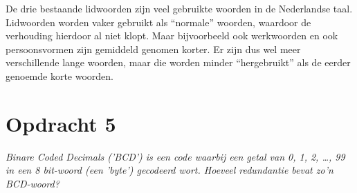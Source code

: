 De drie bestaande lidwoorden zijn veel gebruikte woorden in de Nederlandse taal. Lidwoorden worden vaker gebruikt als ``normale'' woorden, waardoor de verhouding hierdoor al niet klopt. Maar bijvoorbeeld ook werkwoorden en ook persoonsvormen zijn gemiddeld genomen korter. Er zijn dus wel meer verschillende lange woorden, maar die worden minder ``hergebruikt'' als de eerder genoemde korte woorden. 

\section{Opdracht 5}
\emph{Binare Coded Decimals ('BCD') is een code waarbij een getal van 0, 1, 2, \ldots, 99 in een 8 bit-woord (een '\emph{byte}') gecodeerd wort. Hoeveel redundantie bevat zo'n BCD-woord?}



